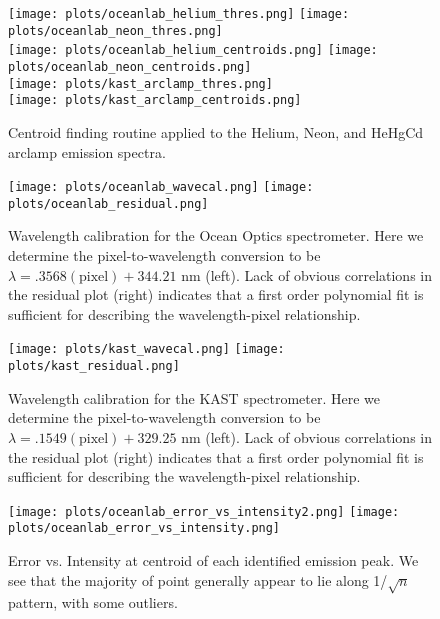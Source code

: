 \documentclass[preprint]{aastex62}
\begin{document}
\begin{figure}[H]
\begin{center}
\texttt{[image: plots/oceanlab\_helium\_thres.png]}
\texttt{[image: plots/oceanlab\_neon\_thres.png]} \\
\texttt{[image: plots/oceanlab\_helium\_centroids.png]}
\texttt{[image: plots/oceanlab\_neon\_centroids.png]} \\
\texttt{[image: plots/kast\_arclamp\_thres.png]} \\
\texttt{[image: plots/kast\_arclamp\_centroids.png]} 
\caption{Centroid finding routine applied to the Helium, Neon, and HeHgCd arclamp emission spectra.} \label{fig:centoid}
\end{center}
\end{figure}

\begin{figure}[H]
\begin{center}
\texttt{[image: plots/oceanlab\_wavecal.png]}
\texttt{[image: plots/oceanlab\_residual.png]}
\caption{Wavelength calibration for the Ocean Optics spectrometer. Here we determine the pixel-to-wavelength conversion to be $\lambda=.3568(\mathrm{pixel})+344.21$ nm (left). Lack of obvious correlations in the residual plot (right) indicates that a first order polynomial fit is sufficient for describing the wavelength-pixel relationship.} \label{fig:oceanlab_wavecal}
\end{center}
\end{figure}

\begin{figure}[H]
\begin{center}
\texttt{[image: plots/kast\_wavecal.png]}
\texttt{[image: plots/kast\_residual.png]}
\caption{Wavelength calibration for the KAST spectrometer. Here we determine the pixel-to-wavelength conversion to be $\lambda=.1549(\mathrm{pixel})+329.25$ nm (left). Lack of obvious correlations in the residual plot (right) indicates that a first order polynomial fit is sufficient for describing the wavelength-pixel relationship.} \label{fig:kast_wavecal}
\end{center}
\end{figure}

\begin{figure}[H]
\begin{center}
\texttt{[image: plots/oceanlab\_error\_vs\_intensity2.png]}
\texttt{[image: plots/oceanlab\_error\_vs\_intensity.png]}
\caption{Error vs. Intensity at centroid of each identified emission peak. We see that the majority of point generally appear to lie along 1/$\sqrt{n}$ pattern, with some outliers.} \label{fig:error_vs_intensity}
\end{center}
\end{figure}
\end{document}
